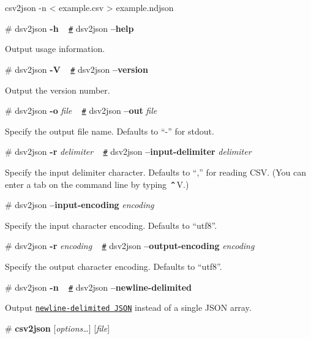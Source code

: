 \begin{DoxyCode}
csv2json -n < example.csv > example.ndjson
\end{DoxyCode}


\label{_dsv2json_help}%
\# dsv2json {\bfseries -\/h} ~\newline
\href{dsv2json_help}{\tt \#} dsv2json {\bfseries --help}

Output usage information.

\label{_dsv2json_version}%
\# dsv2json {\bfseries -\/V} ~\newline
\href{dsv2json_version}{\tt \#} dsv2json {\bfseries --version}

Output the version number.

\label{_dsv2json_out}%
\# dsv2json {\bfseries -\/o} {\itshape file} ~\newline
\href{dsv2json_out}{\tt \#} dsv2json {\bfseries --out} {\itshape file}

Specify the output file name. Defaults to “-\/” for stdout.

\label{_dsv2json_input_delimiter}%
\# dsv2json {\bfseries -\/r} {\itshape delimiter} ~\newline
\href{dsv2json_input_delimiter}{\tt \#} dsv2json {\bfseries --input-\/delimiter} {\itshape delimiter}

Specify the input delimiter character. Defaults to “,” for reading C\+SV. (You can enter a tab on the command line by typing ⌃V.)

\label{_dsv2json_input_encoding}%
\# dsv2json {\bfseries --input-\/encoding} {\itshape encoding}

Specify the input character encoding. Defaults to “utf8”.

\label{_dsv2json_output_encoding}%
\# dsv2json {\bfseries -\/r} {\itshape encoding} ~\newline
\href{dsv2json_output_encoding}{\tt \#} dsv2json {\bfseries --output-\/encoding} {\itshape encoding}

Specify the output character encoding. Defaults to “utf8”.

\label{_dsv2json_newline_delimited}%
\# dsv2json {\bfseries -\/n} ~\newline
\href{dsv2json_newline_delimited}{\tt \#} dsv2json {\bfseries --newline-\/delimited}

Output \href{https://github.com/mbostock/ndjson-cli}{\tt newline-\/delimited J\+S\+ON} instead of a single J\+S\+ON array.

\label{_csv2json}%
\# {\bfseries csv2json} \mbox{[}{\itshape options…}\mbox{]} \mbox{[}{\itshape file}\mbox{]}

